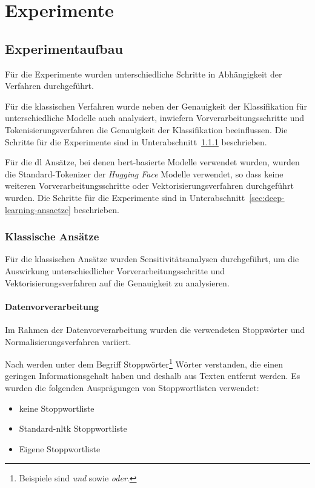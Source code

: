 \section{Experimente}

\subsection{Experimentaufbau}

Für die Experimente wurden unterschiedliche Schritte in Abhängigkeit der Verfahren durchgeführt.

Für die klassischen Verfahren wurde neben der Genauigkeit der Klassifikation für unterschiedliche Modelle auch analysiert, inwiefern Vorverarbeitungsschritte und Token\-isier\-ungs\-verfahren die Genauigkeit der Klassifikation beeinflussen.
Die Schritte für die Experimente sind in Unterabschnitt~\ref{sec:klassische-ansaetze} beschrieben.

Für die \gls{dl} Ansätze, bei denen \gls{bert}-basierte Modelle verwendet wurden, wurden die Standard-Tokenizer der \textit{Hugging Face} Modelle verwendet, so dass keine weiteren Vorverarbeitungsschritte oder Vektorisierungsverfahren durchgeführt wurden.
Die Schritte für die Experimente sind in Unterabschnitt~\ref{sec:deep-learning-ansaetze} beschrieben.

\subsubsection{Klassische Ansätze}\label{sec:klassische-ansaetze}

Für die klassischen Ansätze wurden Sensitivitätsanalysen durchgeführt, um die Auswirkung unterschiedlicher Vorverarbeitungsschritte und Vektorisierungsverfahren auf die Genauigkeit zu analysieren.


\paragraph{Datenvorverarbeitung}
Im Rahmen der Datenvorverarbeitung wurden die verwendeten Stoppwörter und Normalisierungsverfahren variiert.

Nach \cite[S.27]{manning2009introduction} werden unter dem Begriff Stoppwörter\footnote{Beispiele sind \textit{und} sowie \textit{oder}.} Wörter verstanden, die einen geringen Informationsgehalt haben und deshalb aus Texten entfernt werden.
Es wurden die folgenden Ausprägungen von Stoppwortlisten verwendet:
\begin{itemize}
    \item keine Stoppwortliste
    \item Standard-\gls{nltk} Stoppwortliste
    \item Eigene Stoppwortliste
\end{itemize}

